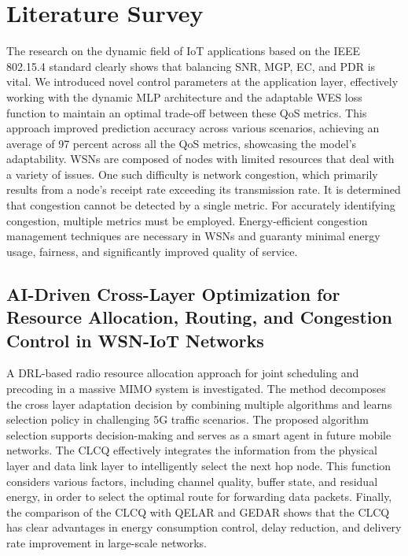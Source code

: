 \documentclass[a4paper,fleqn]{cas-dc}
\numberwithin{equation}{section}
\begin{document}
\section{Literature Survey}
The research \cite{eljakani2025predicting} on the dynamic field of IoT applications based on the IEEE 802.15.4 standard clearly shows that balancing SNR, MGP, EC, and PDR is vital. We introduced novel control parameters at the application layer, effectively working with the dynamic MLP architecture and the adaptable WES loss function to maintain an optimal trade-off between these QoS metrics. This approach improved prediction accuracy across various scenarios, achieving an average of 97 percent across all the QoS metrics, showcasing the model’s adaptability. WSNs are \cite{obaid2024optimizing}composed of nodes with limited resources that deal with a variety of issues. One such difficulty is network congestion, which primarily results from a node’s receipt rate exceeding its transmission rate. It is determined that congestion cannot be detected by a single metric. For accurately identifying congestion,  multiple metrics must be employed. Energy-efficient congestion management techniques are necessary in WSNs and guaranty minimal energy usage, fairness, and significantly improved quality of service.

\subsection{AI-Driven Cross-Layer Optimization for Resource Allocation, Routing, and Congestion Control in WSN-IoT Networks}
A DRL-based radio\cite{huang2023drl} resource allocation approach for joint scheduling and precoding in a massive MIMO system is investigated. The method decomposes the cross layer adaptation decision by combining multiple algorithms and learns selection policy in challenging 5G traffic scenarios. The proposed algorithm selection supports decision-making and serves as a smart agent in future mobile networks. The CLCQ \cite{he2024cross}effectively integrates the information from the physical layer and data link layer to intelligently select the next hop node. This function considers various factors, including channel quality, buffer state, and residual energy, in order to select the optimal route for forwarding data packets. Finally, the comparison of the CLCQ with QELAR and GEDAR shows that the CLCQ has clear advantages in energy consumption control, delay reduction, and delivery rate improvement in large-scale networks.
\end{document}
